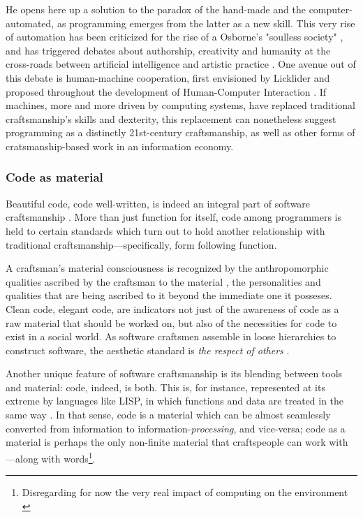 He opens here up a solution to the paradox of the hand-made and the computer-automated, as programming emerges from the latter as a new skill. This very rise of automation has been criticized for the rise of a Osborne's "soulless society" \citep{osborne_aesthetic_1977}, and has triggered debates about authorship, creativity and humanity at the cross-roads between artificial intelligence and artistic practice \citep{mazzone_art_2019}. One avenue out of this debate is human-machine cooperation, first envisioned by Licklider and proposed throughout the development of Human-Computer Interaction \citep{licklider_mancomputer_1960,grudin_tool_2016}. If machines, more and more driven by computing systems, have replaced traditional craftsmanship's skills and dexterity, this replacement can nonetheless suggest programming as a distinctly 21st-century craftsmanship, as well as other forms of cratsmanship-based work in an information economy.

\subsubsection{Code as material}

Beautiful code, code well-written, is indeed an integral part of software craftsmanship \citep{oram_beautiful_2007}. More than just function for itself, code among programmers is held to certain standards which turn out to hold another relationship with traditional craftsmanship—specifically, form following function.

A craftsman's material consciousness is recognized by the anthropomorphic qualities ascribed by the craftsman to the material \citep{sennett_craftsman_2009}, the personalities and qualities that are being ascribed to it beyond the immediate one it posseses. Clean code, elegant code, are indicators not just of the awareness of code as a raw material that should be worked on, but also of the necessities for code to exist in a social world. As software craftsmen assemble in loose hierarchies to construct software, the aesthetic standard is \emph{the respect of others} \citep{abelson_structure_1979}.

Another unique feature of software craftsmanship is its blending between tools and material: code, indeed, is both. This is, for instance, represented at its extreme by languages like LISP, in which functions and data are treated in the same way \citep{mccarthy_lisp_1965}. In that sense, code is a material which can be almost seamlessly converted from information to information-\emph{processing}, and vice-versa; code as a material is perhaps the only non-finite material that craftspeople can work with---along with words\footnote{Disregarding for now the very real impact of computing on the environment \citep{kurp_green_2008}}.

